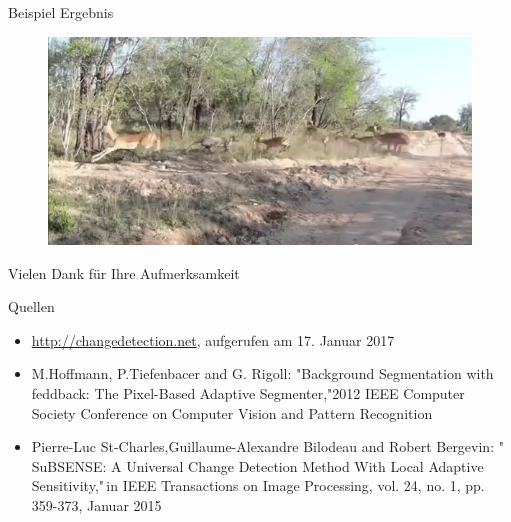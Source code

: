 \documentclass[hyperref={pdfpagelabels=false}]{beamer}
\begin{document}
\begin{frame}[t]{Beispiel Ergebnis}
	\vspace{1.3em}
	\begin{figure}
		\centering
		\includegraphics[width=0.8\linewidth]{Abbildungen/Einstieg/original_small9.jpg}
	\end{figure}
\end{frame}

\begin{frame}
	\centering
	\vspace{3em}
	\large{Vielen Dank für Ihre Aufmerksamkeit}
\end{frame}


\begin{frame}[t]{Quellen}
	\begin{itemize}
		\item \url{http://changedetection.net}, aufgerufen am 17. Januar 2017
		\item M.Hoffmann, P.Tiefenbacer and G. Rigoll: "Background Segmentation with feddback: The Pixel-Based Adaptive Segmenter,"2012 IEEE Computer Society Conference on Computer Vision and Pattern Recognition
		\item Pierre-Luc St-Charles,Guillaume-Alexandre Bilodeau and Robert Bergevin: "\,SuBSENSE: A Universal Change Detection Method With Local Adaptive Sensitivity,"\,in IEEE Transactions on Image Processing, vol. 24, no. 1, pp. 359-373, Januar 2015
	\end{itemize}
\end{frame}
\end{document}
